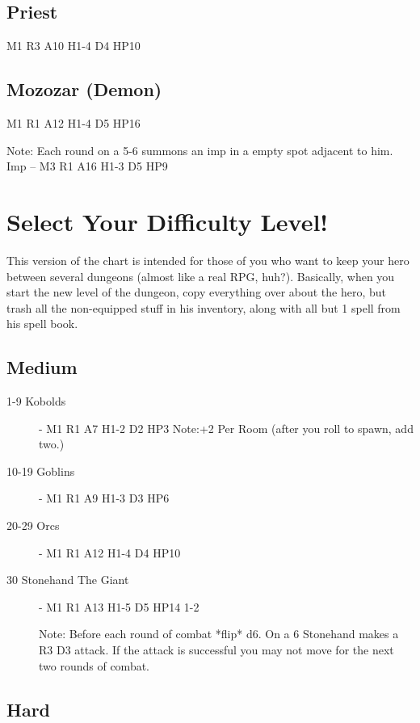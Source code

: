 \documentclass[a6paper,hidelinks]{article}
\begin{document}
\subsection{Priest}
M1 R3 A10 H1-4 D4 HP10

\subsection{Mozozar (Demon)}
M1 R1 A12 H1-4 D5 HP16

Note: Each round on a 5-6 summons an imp in a empty spot adjacent to him.
Imp – M3 R1 A16 H1-3 D5 HP9

\section{Select Your Difficulty Level!}

This version of the chart is intended for those of you who want to keep your hero between several dungeons (almost like a real RPG, huh?). Basically, when
you start the new level of the dungeon, copy everything over about the hero, but trash all the non-equipped stuff in his inventory, along with all but 1 spell from his spell book.

\subsection{Medium}

\begin{description}
\item[1-9 Kobolds] - M1 R1 A7 H1-2 D2 HP3 
Note:+2 Per Room (after you roll to spawn, add two.)

\item[10-19 Goblins] - M1 R1 A9 H1-3 D3 HP6

\item[20-29 Orcs] - M1 R1 A12 H1-4 D4 HP10

\item[30 Stonehand The Giant] - M1 R1 A13 H1-5 D5 HP14 1-2

Note: Before each round of combat *flip* d6. On a 6 Stonehand makes a R3 D3 attack. If the attack is successful you may not move for the next two rounds of combat.

\end{description}

\subsection{Hard}
\end{document}
